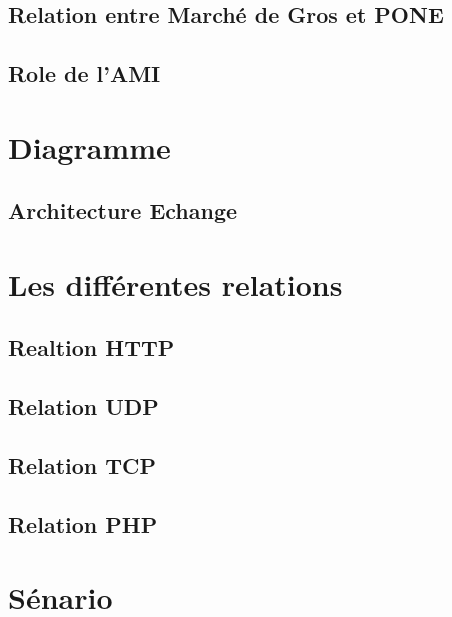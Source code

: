 \documentclass[a4paper, 11pt, french]{report}
\begin{document}
\subsection{Relation entre Marché de Gros et PONE}


\subsection{Role de l'AMI}


\section{Diagramme}


\subsection{Architecture Echange}


\section{Les différentes relations}


\subsection{Realtion HTTP}


\subsection{Relation UDP}


\subsection{Relation TCP}


\subsection{Relation PHP}


\section{Sénario}

\end{document}
